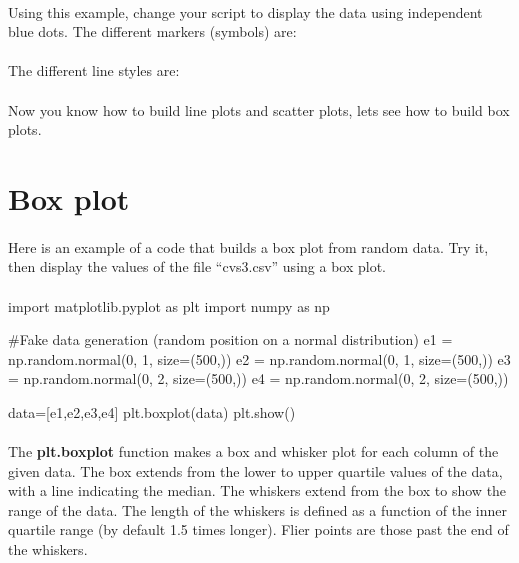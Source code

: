 \documentclass[article,10pt]{scrartcl}
\begin{document}
\paragraph{}
Using this example, change your script to display the data using independent blue dots. The different markers (symbols) are: 
\begin{python}
\end{python}
\paragraph{}
The different line styles are:
\begin{python}
[ '-' | '--' | '-.' | ':' | 'None' | ' ' | '' ] 
\end{python}
\paragraph{}
Now you know how to build line plots and scatter plots, lets see how to build box plots.

\section{Box plot}
\paragraph{}
Here is an example of a code that builds a box plot from random data. Try it, then display the values of the file ``cvs3.csv'' using a box plot. 
\paragraph{}
\begin{python}
import matplotlib.pyplot as plt
import numpy as np

#Fake data generation (random position on a normal distribution)
e1 = np.random.normal(0, 1, size=(500,))
e2 = np.random.normal(0, 1, size=(500,))
e3 = np.random.normal(0, 2, size=(500,))
e4 = np.random.normal(0, 2, size=(500,))

data=[e1,e2,e3,e4]
plt.boxplot(data)
plt.show()
\end{python}
\paragraph{}
The \textbf{plt.boxplot} function makes a box and whisker plot for each column of the given data.  The box extends from the lower to upper quartile values of the data, with a line indicating the median.
The whiskers extend from the box to show the range of the data.  The length of the whiskers is defined as a function of the inner quartile range (by default 1.5 times longer). Flier points are those past the end of the whiskers.
\end{document}
